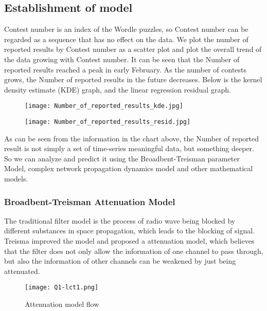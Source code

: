\documentclass{mcmthesis}
\begin{document}
\subsection{Establishment of model}
Contest number is an index of the Wordle puzzles, so Contest number can be regarded as a sequence that has no effect on the data. We plot the number of reported results by Contest number as a scatter plot and plot the overall trend of the data growing with Contest number. It can be seen that the Number of reported results reached a peak in early February. As the number of contests grows, the Number of reported results in the future decreases. Below is the kernel density estimate (KDE) graph, and the linear regression residual graph.
\begin{figure}[H]
	\subfigure
	{
		\begin{minipage}[b]{.28\linewidth}
			\centering
			\texttt{[image: Number\_of\_reported\_results\_kde.jpg]}
		\end{minipage}
	} \quad \quad \quad \quad \quad \quad \quad 
	\subfigure
	{
		\begin{minipage}[b]{.28\linewidth}
			\texttt{[image: Number\_of\_reported\_results\_resid.jpg]}
		\end{minipage}
	}
\end{figure}

As can be seen from the information in the chart above, the Number of reported result is not simply a set of time-series meaningful data, but something deeper. So we can analyze and predict it using the Broadbent-Treisman parameter Model, complex network propagation dynamics model and other mathematical models.

\subsubsection{Broadbent-Treisman Attenuation Model}
The traditional filter model is the process of radio wave being blocked by different substances in space propagation, which leads to the blocking of signal. Treisma improved the model and proposed a attenuation model, which believes that the filter does not only allow the information of one channel to pass through, but also the information of other channels can be weakened by just being attenuated.
\begin{figure}[H]
	\centering
	\texttt{[image: Q1-lct1.png]}
	\caption{\small Attenuation model flow}
\end{figure}
\end{document}
